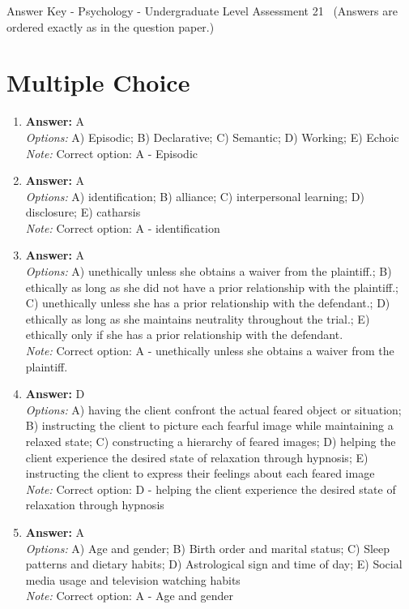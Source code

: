 \documentclass[12pt]{article}
\begin{document}
\begin{center}
Answer Key - Psychology - Undergraduate Level Assessment 21 \
\small (Answers are ordered exactly as in the question paper.)
\end{center}

\section*{Multiple Choice}
\begin{enumerate}[label=\arabic*.]
\item \textbf{Answer:} A
\\ \textit{Options:} A) Episodic; B) Declarative; C) Semantic; D) Working; E) Echoic
\\ \textit{Note:} Correct option: A - Episodic
\item \textbf{Answer:} A
\\ \textit{Options:} A) identification; B) alliance; C) interpersonal learning; D) disclosure; E) catharsis
\\ \textit{Note:} Correct option: A - identification
\item \textbf{Answer:} A
\\ \textit{Options:} A) unethically unless she obtains a waiver from the plaintiff.; B) ethically as long as she did not have a prior relationship with the plaintiff.; C) unethically unless she has a prior relationship with the defendant.; D) ethically as long as she maintains neutrality throughout the trial.; E) ethically only if she has a prior relationship with the defendant.
\\ \textit{Note:} Correct option: A - unethically unless she obtains a waiver from the plaintiff.
\item \textbf{Answer:} D
\\ \textit{Options:} A) having the client confront the actual feared object or situation; B) instructing the client to picture each fearful image while maintaining a relaxed state; C) constructing a hierarchy of feared images; D) helping the client experience the desired state of relaxation through hypnosis; E) instructing the client to express their feelings about each feared image
\\ \textit{Note:} Correct option: D - helping the client experience the desired state of relaxation through hypnosis
\item \textbf{Answer:} A
\\ \textit{Options:} A) Age and gender; B) Birth order and marital status; C) Sleep patterns and dietary habits; D) Astrological sign and time of day; E) Social media usage and television watching habits
\\ \textit{Note:} Correct option: A - Age and gender
\end{enumerate}
\end{document}
